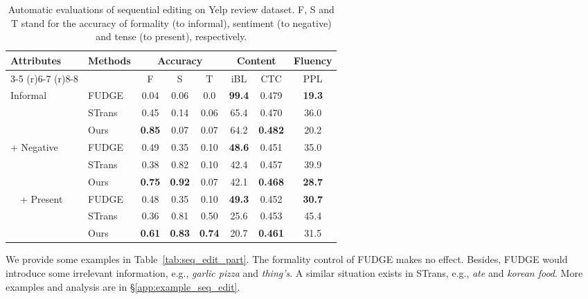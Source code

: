 \documentclass[11pt]{article}
\begin{document}
\begin{table}[t]
    \centering
    \scriptsize
    \vspace{-20pt}
    \setlength\tabcolsep{4.5pt}
    \begin{tabular}{llcccccc}
    \toprule
    \multirow{3}{*}{Attributes}&\multirow{3}{*}{Methods}&\multicolumn{3}{c}{Accuracy}&\multicolumn{2}{c}{Content}&Fluency\\ \cmidrule(r){3-5}  \cmidrule(r){6-7}  \cmidrule(r){8-8} 
     &    & F & S & T & iBL & CTC  &PPL\\\midrule
        \multirow{3}{*}{Informal}& FUDGE & 0.04& 0.06& 0.0 &\textbf{99.4}&0.479&\textbf{19.3}  \\
        & STrans & 0.45      & 0.14      & {0.06}  & {65.4}  & 0.470& 36.0 \\
    & Ours   & \textbf{0.85}      & {0.07}      & 0.07  & 64.2  & \textbf{0.482}& {20.2} \\\midrule
    \multirow{3}{*}{+ Negative}&  FUDGE &   0.49    & 0.35     &  0.10 & \textbf{48.6} & 0.451 & {35.0} \\
    &STrans & 0.38      & 0.82      & 0.10   & {42.4} & 0.457 & 39.9 \\
    & Ours   & \textbf{0.75}      & \textbf{0.92}      & {0.07}  & 42.1 & \textbf{0.468}& \textbf{28.7}  \\\midrule
    \multirow{3}{*}{\ \ + Present} & FUDGE &  0.48    & 0.35      &  0.10 & \textbf{49.3} & {0.452}& \textbf{30.7}  \\
    & STrans & 0.36      & 0.81      & 0.50   & {25.6}  & 0.453& 45.4 \\
    & Ours   & \textbf{0.61}      & \textbf{0.83}      & \textbf{0.74}  & 20.7 & \textbf{0.461}&{31.5}\\\bottomrule
    \end{tabular}
\caption{Automatic evaluations of sequential editing on Yelp review dataset. F, S and T stand for the accuracy of formality (to informal), sentiment (to negative) and tense (to present), respectively.
    }
    \label{tab:seq_edit_auto}
    \vspace{-10pt}
\end{table}
We provide some examples in Table~\ref{tab:seq_edit_part}. The formality control of FUDGE makes no effect. Besides, FUDGE would introduce some irrelevant information, e.g., \textit{garlic pizza} and \textit{thing's}. A similar situation exists in STrans, e.g., \textit{ate} and \textit{korean food}.  
More examples and analysis are in \S\ref{app:example_seq_edit}.
\end{document}
